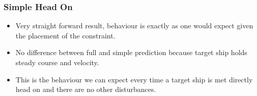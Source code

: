 \subsubsection{Simple Head On}
\begin{itemize}
    \item Very straight forward result, behaviour is exactly as one would expect given the placement of the constraint.
    \item No difference between full and simple prediction because target ship holds steady course and velocity.
    \item This is the behaviour we can expect every time a target ship is met directly head on and there are no other disturbances.
\end{itemize}
\clearpage


